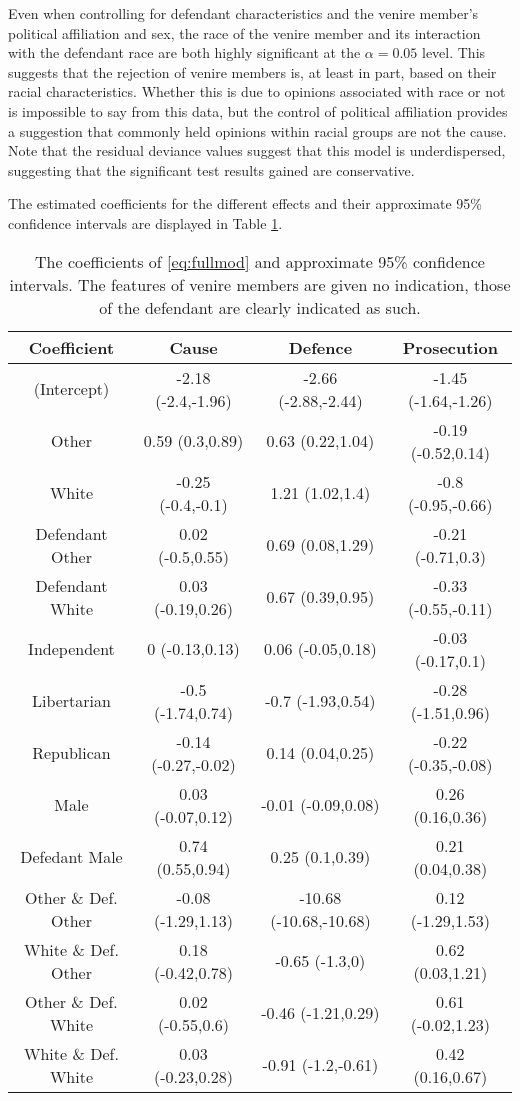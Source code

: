 Even when controlling for defendant characteristics and the venire member's political affiliation and sex, the race of the venire
member and its interaction with the defendant race are both highly significant at the $\alpha = 0.05$ level. This suggests that
the rejection of venire members is, at least in part, based on their racial characteristics. Whether this is due to opinions
associated with race or not is impossible to say from this data, but the control of political affiliation provides a suggestion
that commonly held opinions within racial groups are not the cause. Note that the residual deviance values suggest that this model
is underdispersed, suggesting that the significant test results gained are conservative.

The estimated coefficients for the different effects and their approximate 95\% confidence intervals are displayed in Table
\ref{tab:fullmodracecoef}.

\begin{table}[h!]
  \centering
  \caption[Final Model Race Coefficients Confidence Intervals Excluding Kept]{The coefficients of \ref{eq:fullmod} and approximate
    95\% confidence intervals. The features of venire members are given no indication, those of the defendant are clearly
    indicated as such.}
  \label{tab:fullmodracecoef}
  \begin{tabular}{|c|c|c|c|} \hline
    Coefficient & Cause & Defence & Prosecution \\ \hline
    (Intercept) & -2.18 (-2.4,-1.96) & -2.66 (-2.88,-2.44) & -1.45 (-1.64,-1.26)\\
    Other & 0.59 (0.3,0.89) & 0.63 (0.22,1.04) & -0.19 (-0.52,0.14)\\
    White & -0.25 (-0.4,-0.1) & 1.21 (1.02,1.4) & -0.8 (-0.95,-0.66)\\
    Defendant Other & 0.02 (-0.5,0.55) & 0.69 (0.08,1.29) & -0.21 (-0.71,0.3)\\
    Defendant White & 0.03 (-0.19,0.26) & 0.67 (0.39,0.95) & -0.33 (-0.55,-0.11)\\
    Independent & 0 (-0.13,0.13) & 0.06 (-0.05,0.18) & -0.03 (-0.17,0.1)\\
    Libertarian & -0.5 (-1.74,0.74) & -0.7 (-1.93,0.54) & -0.28 (-1.51,0.96)\\
    Republican & -0.14 (-0.27,-0.02) & 0.14 (0.04,0.25) & -0.22 (-0.35,-0.08)\\
    Male & 0.03 (-0.07,0.12) & -0.01 (-0.09,0.08) & 0.26 (0.16,0.36)\\
    Defedant Male & 0.74 (0.55,0.94) & 0.25 (0.1,0.39) & 0.21 (0.04,0.38)\\
    Other \& Def. Other & -0.08 (-1.29,1.13) & -10.68 (-10.68,-10.68) & 0.12 (-1.29,1.53)\\
    White \& Def. Other & 0.18 (-0.42,0.78) & -0.65 (-1.3,0) & 0.62 (0.03,1.21)\\
    Other \& Def. White & 0.02 (-0.55,0.6) & -0.46 (-1.21,0.29) & 0.61 (-0.02,1.23)\\
    White \& Def. White & 0.03 (-0.23,0.28) & -0.91 (-1.2,-0.61) & 0.42 (0.16,0.67) \\ \hline
  \end{tabular}
\end{table}

